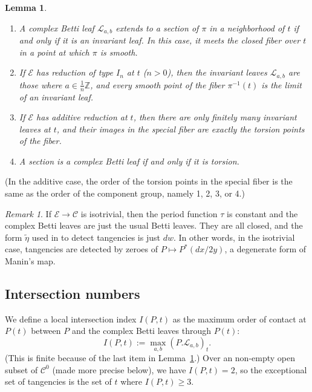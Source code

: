 \documentclass[12pt,reqno]{amsart}
\numberwithin{equation}{section}
\theoremstyle{plain}
\newtheorem{lemma}[subsection]{Lemma}
\theoremstyle{definition}
\theoremstyle{remark}
\newtheorem{rem}[subsection]{Remark}
\newcommand{\CC}{\mathcal{C}}
\newcommand{\EE}{\mathcal{E}}
\newcommand{\LL}{\mathcal{L}}
\newcommand{\Z}{\mathbb{Z}}
\newcommand{\<}{\langle}
\renewcommand{\>}{\rangle}
\numberwithin{equation}{section}
\begin{document}
\begin{lemma}\label{lemma:inv-leaves}\mbox{}
  \begin{enumerate}
  \item A complex Betti leaf $\LL_{a,b}$ extends to a section of $\pi$
    in a neighborhood of $t$ if and only if it is an invariant leaf.
    In this case, it meets the closed fiber over $t$ in a point at which
    $\pi$ is smooth.
  \item If $\EE$ has reduction of type $I_n$ at $t$
    \textup{(}$n>0$\textup{)}, then the invariant leaves $\LL_{a,b}$
    are those where $a\in\frac1n\Z$, and every smooth point of the
    fiber $\pi^{-1}(t)$ is the limit of an invariant leaf.
    \item If $\EE$ has additive reduction at $t$, then there are
        only finitely many invariant leaves at $t$, and their images
        in the special fiber are exactly the torsion points of the
        fiber.
     \item A section is a complex Betti leaf if and only if it is
       torsion. 
  \end{enumerate}
\end{lemma}

(In the additive case, the order of the torsion points in the special
fiber is the same as the order of the component group, namely 1, 2, 3,
or 4.)

\begin{rem}\label{rem:isotrivial}
  If $\EE\to\CC$ is isotrivial, then the period function $\tau$ is
  constant and the complex Betti leaves are just the usual Betti
  leaves.  They are all closed, and the form $\tilde\eta$ used in
  \cite{UlmerUrzua21} to detect tangencies is just $dw$.  In other
  words, in the isotrivial case, tangencies are detected by zeroes of
  $P\mapsto P^*(dx/2y)$, a degenerate form of Manin's map.
\end{rem}



\subsection{Intersection numbers}
We define a local intersection index $I(P,t)$ as the maximum order of
contact at $P(t)$ between $P$ and the complex Betti leaves through
$P(t)$:
\[I(P,t):=\max_{a,b}\left(P.\LL_{a,b}\right)_t.\]
(This is finite because of the last item in
Lemma~\ref{lemma:inv-leaves}.)   Over an non-empty open subset of
$\CC^0$ (made more precise below), we have $I(P,t)=2$, so the
exceptional set of tangencies is the set of $t$ where $I(P,t)\ge3$.
\end{document}
